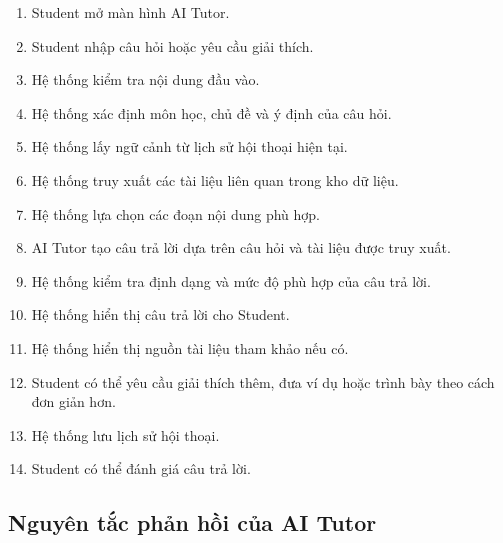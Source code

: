 \begin{enumerate}
	\item Student mở màn hình AI Tutor.
	
	\item Student nhập câu hỏi hoặc yêu cầu giải thích.
	
	\item Hệ thống kiểm tra nội dung đầu vào.
	
	\item Hệ thống xác định môn học, chủ đề và ý định của câu hỏi.
	
	\item Hệ thống lấy ngữ cảnh từ lịch sử hội thoại hiện tại.
	
	\item Hệ thống truy xuất các tài liệu liên quan trong kho dữ liệu.
	
	\item Hệ thống lựa chọn các đoạn nội dung phù hợp.
	
	\item AI Tutor tạo câu trả lời dựa trên câu hỏi và tài liệu được truy
	xuất.
	
	\item Hệ thống kiểm tra định dạng và mức độ phù hợp của câu trả lời.
	
	\item Hệ thống hiển thị câu trả lời cho Student.
	
	\item Hệ thống hiển thị nguồn tài liệu tham khảo nếu có.
	
	\item Student có thể yêu cầu giải thích thêm, đưa ví dụ hoặc trình bày
	theo cách đơn giản hơn.
	
	\item Hệ thống lưu lịch sử hội thoại.
	
	\item Student có thể đánh giá câu trả lời.
\end{enumerate}

\subsection{Nguyên tắc phản hồi của AI Tutor}

